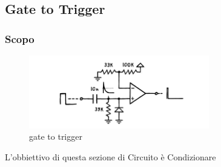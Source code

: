 \documentclass{article}
\begin{document}
\subsection{Gate to Trigger}
\subsubsection{Scopo}

\begin{figure}[htp]
    \centering
    \includegraphics[width=0.7\textwidth]{gatebase.png} 
    \caption{gate to trigger}
    \label{fig:gate to trigger}
\end{figure}
L'obbiettivo di questa sezione di Circuito è Condizionare 
\end{document}

